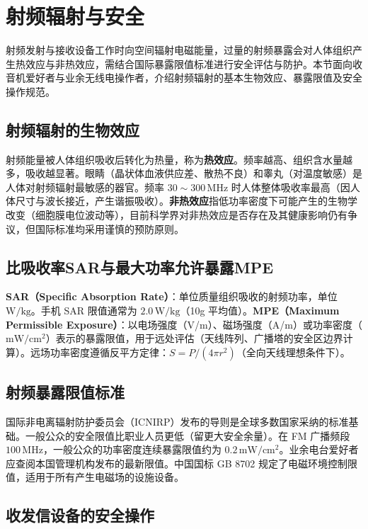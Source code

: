 \documentclass[12pt,UTF8]{ctexbook}
\begin{document}
\section{射频辐射与安全}
\label{sec:rf_radiation_safety}

射频发射与接收设备工作时向空间辐射电磁能量，过量的射频暴露会对人体组织产生热效应与非热效应，需结合国际暴露限值标准进行安全评估与防护。本节面向收音机爱好者与业余无线电操作者，介绍射频辐射的基本生物效应、暴露限值及安全操作规范。

\subsection{射频辐射的生物效应}

射频能量被人体组织吸收后转化为热量，称为\textbf{热效应}。频率越高、组织含水量越多，吸收越显著。眼睛（晶状体血液供应差、散热不良）和睾丸（对温度敏感）是人体对射频辐射最敏感的器官。频率 $30\sim300\,\mathrm{MHz}$ 时人体整体吸收率最高（因人体尺寸与波长接近，产生谐振吸收）。\textbf{非热效应}指低功率密度下可能产生的生物学改变（细胞膜电位波动等），目前科学界对非热效应是否存在及其健康影响仍有争议，但国际标准均采用谨慎的预防原则。

\subsection{比吸收率SAR与最大功率允许暴露MPE}

\textbf{SAR（Specific Absorption Rate）}：单位质量组织吸收的射频功率，单位 $\mathrm{W/kg}$。手机 SAR 限值通常为 $2.0\,\mathrm{W/kg}$（10g 平均值）。\textbf{MPE（Maximum Permissible Exposure）}：以电场强度（V/m）、磁场强度（A/m）或功率密度（$\mathrm{mW/cm^2}$）表示的暴露限值，用于远处评估（天线阵列、广播塔的安全区边界计算）。远场功率密度遵循反平方定律：$S = P/(4\pi r^2)$（全向天线理想条件下）。

\subsection{射频暴露限值标准}

国际非电离辐射防护委员会（ICNIRP）发布的导则是全球多数国家采纳的标准基础。一般公众的安全限值比职业人员更低（留更大安全余量）。在 FM 广播频段 $100\,\mathrm{MHz}$，一般公众的功率密度连续暴露限值约为 $0.2\,\mathrm{mW/cm^2}$。业余电台爱好者应查阅本国管理机构发布的最新限值。中国国标 GB 8702 规定了电磁环境控制限值，适用于所有产生电磁场的设施设备。

\subsection{收发信设备的安全操作}
\end{document}
